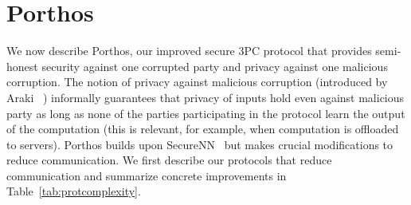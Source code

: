 \section{Porthos}\label{sec:porthos}

We now describe Porthos, our improved secure 3PC protocol that
provides semi-honest security against one corrupted party
and privacy against one malicious corruption. The notion of privacy
against malicious corruption (introduced by Araki
\etal~\cite{maliciousprivacy}) informally guarantees that privacy of
inputs hold even against malicious party as long as none of the parties participating in the
protocol learn the output of the computation (this is relevant, for
example, when computation is offloaded to servers). Porthos builds
upon SecureNN~\cite{securenn} but makes crucial modifications to
reduce communication.
We first describe our protocols that reduce communication and
summarize concrete improvements in Table~\ref{tab:protcomplexity}.

